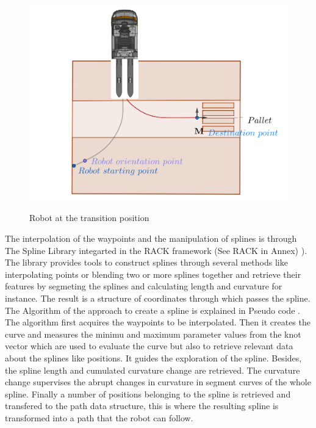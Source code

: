 \begin{figure}[H]
    \begin{center}
        \includegraphics[width=5in]{images/Chap2/truck_transition.png}\\
        \caption{Robot at the transition position}
        \label{transition}
        \end{center}    
\end{figure}

The interpolation of the waypoints and the manipulation of splines is through The Spline Library integarted in 
the RACK framework (See RACK in Annex)
). The library provides tools to construct splines through several methods like interpolating points or blending two or more splines 
together and retrieve their features by segmeting the splines and calculating length and curvature for instance.
The result is a structure of coordinates through which passes the spline. 
The Algorithm of the approach to create a spline is explained in Pseudo code .
The algorithm first acquires the waypoints to be interpolated. Then it creates the curve 
and measures the minimu and maximum parameter values from the knot vector which are used to evaluate 
the curve but also to retrieve relevant data about the splines like positions. It guides the exploration
of the spline. Besides, the spline length and cumulated curvature change are retrieved. 
The curvature change supervises the abrupt changes in curvature in segment curves of the whole spline.
Finally a number of positions belonging to the spline is retrieved and transfered to the path data structure,
this is where the resulting spline is transformed into a path that the robot can follow.

